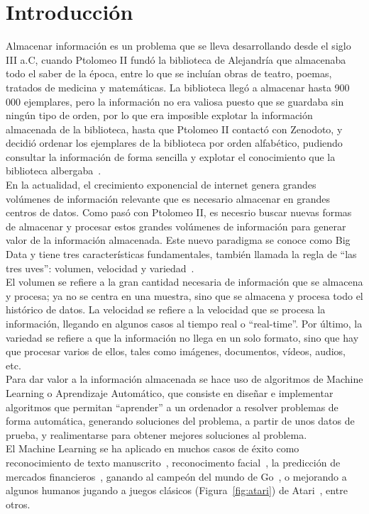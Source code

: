 \chapter{Introducción}

Almacenar información es un problema que se lleva desarrollando desde el siglo III a.C, cuando Ptolomeo II fundó la biblioteca de Alejandría que almacenaba todo el saber de la época, entre lo que se incluían obras de teatro, poemas, tratados de medicina y matemáticas. La biblioteca llegó a almacenar hasta 900\,000 ejemplares, pero la información no era valiosa puesto que se guardaba sin ningún tipo de orden, por lo que era imposible explotar la información almacenada de la biblioteca, hasta que Ptolomeo II contactó con Zenodoto, y decidió ordenar los ejemplares de la biblioteca por orden alfabético, pudiendo consultar la información de forma sencilla y explotar el conocimiento que la biblioteca albergaba~\cite{bigdataintroduccion}.\\

En la actualidad, el crecimiento exponencial de internet genera grandes volúmenes de información relevante que es necesario almacenar en grandes centros de datos. Como pasó con Ptolomeo II, es necesrio buscar nuevas formas de almacenar y procesar estos grandes volúmenes de información para generar valor de la información almacenada. Este nuevo paradigma se conoce como Big Data y tiene tres características fundamentales, también llamada la regla de ``las tres uves'': volumen, velocidad y variedad~\cite{bigdataoreilly}.\\
El volumen se refiere a la gran cantidad necesaria de información que se almacena y procesa; ya no se centra en una muestra, sino que se almacena y procesa todo el histórico de datos. La velocidad se refiere a la velocidad que se procesa la información, llegando en algunos casos al tiempo real o ``real-time''. Por último, la variedad se refiere a que la información no llega en un solo formato, sino que hay que procesar varios de ellos, tales como imágenes, documentos, vídeos, audios, etc.\\

Para dar valor a la información almacenada se hace uso de algoritmos de Machine Learning o Aprendizaje Automático, que consiste en diseñar e implementar algoritmos que permitan ``aprender'' a un ordenador a resolver problemas de forma automática, generando soluciones del problema, a partir de unos datos de prueba, y realimentarse para obtener mejores soluciones al problema.\\
El Machine Learning se ha aplicado en muchos casos de éxito como reconocimiento de texto manuscrito~\cite{Murphy:2012:MLP:2380985}, reconocimento facial~\cite{Szeliski:2010:CVA:1941882}, la predicción de mercados financieros~\cite{citeulike:13778368}, ganando al campeón del mundo de Go~\cite{44806}, o mejorando a algunos humanos jugando a juegos clásicos (Figura~\ref{fig:atari}) de Atari~\cite{mnih-dqn-2015}, entre otros.\\

